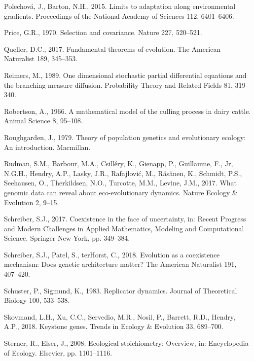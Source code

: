 \documentclass[]{elsarticle} %
\begin{document}
\leavevmode\hypertarget{ref-Polechov2015}{}%
Polechová, J., Barton, N.H., 2015. Limits to adaptation along
environmental gradients. Proceedings of the National Academy of Sciences
112, 6401--6406.

\leavevmode\hypertarget{ref-PRICE1970}{}%
Price, G.R., 1970. Selection and covariance. Nature 227, 520--521.

\leavevmode\hypertarget{ref-Queller2017}{}%
Queller, D.C., 2017. Fundamental theorems of evolution. The American
Naturalist 189, 345--353.

\leavevmode\hypertarget{ref-Reimers1989}{}%
Reimers, M., 1989. One dimensional stochastic partial differential
equations and the branching measure diffusion. Probability Theory and
Related Fields 81, 319--340.

\leavevmode\hypertarget{ref-Robertson1966}{}%
Robertson, A., 1966. A mathematical model of the culling process in
dairy cattle. Animal Science 8, 95--108.

\leavevmode\hypertarget{ref-joanroughgarden1979}{}%
Roughgarden, J., 1979. Theory of population genetics and evolutionary
ecology: An introduction. Macmillan.

\leavevmode\hypertarget{ref-Rudman2017}{}%
Rudman, S.M., Barbour, M.A., Csilléry, K., Gienapp, P., Guillaume, F.,
Jr, N.G.H., Hendry, A.P., Lasky, J.R., Rafajlović, M., Räsänen, K.,
Schmidt, P.S., Seehausen, O., Therkildsen, N.O., Turcotte, M.M., Levine,
J.M., 2017. What genomic data can reveal about eco-evolutionary
dynamics. Nature Ecology \& Evolution 2, 9--15.

\leavevmode\hypertarget{ref-Schreiber2017}{}%
Schreiber, S.J., 2017. Coexistence in the face of uncertainty, in:
Recent Progress and Modern Challenges in Applied Mathematics, Modeling
and Computational Science. Springer New York, pp. 349--384.

\leavevmode\hypertarget{ref-Schreiber2018}{}%
Schreiber, S.J., Patel, S., terHorst, C., 2018. Evolution as a
coexistence mechanism: Does genetic architecture matter? The American
Naturalist 191, 407--420.

\leavevmode\hypertarget{ref-Schuster1983}{}%
Schuster, P., Sigmund, K., 1983. Replicator dynamics. Journal of
Theoretical Biology 100, 533--538.

\leavevmode\hypertarget{ref-Skovmand2018}{}%
Skovmand, L.H., Xu, C.C., Servedio, M.R., Nosil, P., Barrett, R.D.,
Hendry, A.P., 2018. Keystone genes. Trends in Ecology \& Evolution 33,
689--700.

\leavevmode\hypertarget{ref-Sterner2008}{}%
Sterner, R., Elser, J., 2008. Ecological stoichiometry: Overview, in:
Encyclopedia of Ecology. Elsevier, pp. 1101--1116.
\end{document}
